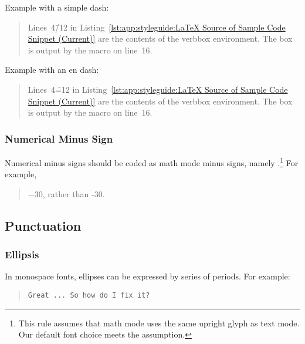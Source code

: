 Example with a simple dash:

\begin{quote}
  Lines~4\=/12 in
  Listing~\ref{lst:app:styleguide:LaTeX Source of Sample Code Snippet (Current)}
  are the contents of the verbbox environment. The box is output
  by the \co{\\theverbbox} macro on line~16.
\end{quote}

Example with an en dash:

\begin{quote}
  Lines~4\==12 in
  Listing~\ref{lst:app:styleguide:LaTeX Source of Sample Code Snippet (Current)}
  are the contents of the verbbox environment. The box is output
  by the \co{\\theverbbox} macro on line~16.
\end{quote}

\subsubsection{Numerical Minus Sign}
\label{sec:app:styleguide:Numerical Minus Sign}

Numerical minus signs should be coded as math mode minus signs,
namely \qco{$-$}.\footnote{This rule assumes that math mode uses the
  same upright glyph as text mode. Our default font choice meets
  the assumption.
}
For example,

\begin{quote}
  $-30$, rather than -30.
\end{quote}

\subsection{Punctuation}
\label{sec:app:styleguide:Punctuation}

\subsubsection{Ellipsis}
\label{sec:app:styleguide:Ellipsis}

In monospace fonts, ellipses can be expressed by
series of periods. For example:

\begin{quote}
  \verb|Great ... So how do I fix it?|
\end{quote}

